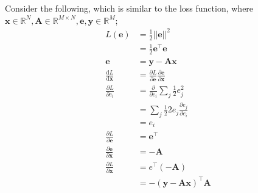 \documentclass[a4paper, 12pt]{article}
\newcommand{\pdif}[2]{\frac{\partial #1}{\partial #2}}
\newcommand{\dif}[2]{\frac{\mathrm{d}#1}{\mathrm{d}#2}}
\newcommand{\summation}[2]{\sum\limits_{#1}^{#2}}
\newcommand{\mat}[1]{\boldsymbol{#1}}
\renewcommand{\vec}[1]{\boldsymbol{#1}}
\begin{document}
            Consider the following, which is similar to the loss function, where $\vec{x} \in \mathbb{R}^N, \mat{A} \in \mathbb{R}^{M \times N}, \vec{e}, \vec{y} \in \mathbb{R}^M$;
            \begin{align*}
                L(\vec{e}) & = \frac{1}{2} || \vec{e} ||^2 \\
                & = \frac{1}{2} \vec{e}^\top\vec{e} \\
                \vec{e} & = \vec{y} - \mat{A}\vec{x} \\
                \dif{L}{\vec{x}} & = \pdif{L}{\vec{e}} \pdif{\vec{e}}{\vec{x}} \\
                \pdif{L}{e_i} & = \pdif{}{e_i} \summation{j}{} \frac{1}{2} e_j^2 \\
                & = \summation{j}{} \frac{1}{2} 2e_j \pdif{e_j}{e_i} \\
                & = e_i \\
                \pdif{L}{\vec{e}} & = \vec{e}^\top \\
                \pdif{\vec{e}}{\vec{x}} & = -\mat{A} \\
                \pdif{L}{\vec{x}} & = e^\top(-\mat{A}) \\
                & = -(\vec{y} - \mat{A}\vec{x})^\top\mat{A}
            \end{align*}
\end{document}
